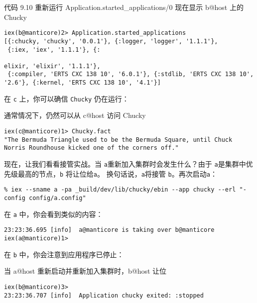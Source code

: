 代码 9.10 重新运行 Application.started\_applications/0 现在显示 b@host
上的 Chucky

\begin{code}{}
\begin{verbatim}
iex(b@manticore)2> Application.started_applications
[{:chucky, 'chucky', '0.0.1'}, {:logger, 'logger', '1.1.1'},
 {:iex, 'iex', '1.1.1'}, {:

elixir, 'elixir', '1.1.1'},
 {:compiler, 'ERTS CXC 138 10', '6.0.1'}, {:stdlib, 'ERTS CXC 138 10', '2.6'}, {:kernel, 'ERTS CXC 138 10', '4.1'}]
\end{verbatim}
\end{code}

在 \texttt{c} 上，你可以确信
\texttt{Chucky} 仍在运行：

\begin{code}{通常情况下，仍然可以从 c@host 访问 Chucky}

\begin{verbatim}
iex(c@manticore)1> Chucky.fact
"The Bermuda Triangle used to be the Bermuda Square, until Chuck Norris Roundhouse kicked one of the corners off."
\end{verbatim}
\end{code}

现在，让我们看看接管实战。当 \texttt{a}重新加入集群时会发生什么？由于 \texttt{a}是集群中优先级最高的节点，\texttt{b} 将让位给\texttt{a}。
换句话说，\texttt{a}将接管 \texttt{b}。再次启动\texttt{a}：

\begin{code}{}
\begin{verbatim}
% iex --sname a -pa _build/dev/lib/chucky/ebin --app chucky --erl "-config config/a.config"
\end{verbatim}
\end{code}

在 \texttt{a} 中，你会看到类似的内容：

\begin{code}{}
\begin{verbatim}
23:23:36.695 [info]  a@manticore is taking over b@manticore
iex(a@manticore)1>
\end{verbatim}
\end{code}

在 \texttt{b} 中，你会注意到应用程序已停止：

\begin{code}{当 a@host 重新启动并重新加入集群时，b@host 让位}

\begin{verbatim}
iex(b@manticore)3>
23:23:36.707 [info]  Application chucky exited: :stopped
\end{verbatim}
\end{code}

